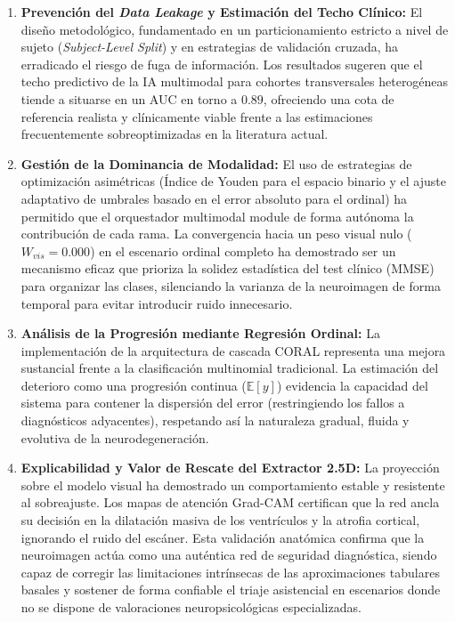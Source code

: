 \documentclass[12pt, oneside, english, spanish]{book}
\begin{document}
\begin{enumerate}
	\item \textbf{Prevención del \textit{Data Leakage} y Estimación del Techo Clínico:} El diseño metodológico, fundamentado en un particionamiento estricto a nivel de sujeto (\textit{Subject-Level Split}) y en estrategias de validación cruzada, ha erradicado el riesgo de fuga de información. Los resultados sugeren que el techo predictivo de la IA multimodal para cohortes transversales heterogéneas tiende a situarse en un AUC en torno a $0.89$, ofreciendo una cota de referencia realista y clínicamente viable frente a las estimaciones frecuentemente sobreoptimizadas en la literatura actual.
	
	\item \textbf{Gestión de la Dominancia de Modalidad:} El uso de estrategias de optimización asimétricas (Índice de Youden para el espacio binario y el ajuste adaptativo de umbrales basado en el error absoluto para el ordinal) ha permitido que el orquestador multimodal module de forma autónoma la contribución de cada rama. La convergencia hacia un peso visual nulo ($W_{vis} = 0.000$) en el escenario ordinal completo ha demostrado ser un mecanismo eficaz que prioriza la solidez estadística del test clínico (MMSE) para organizar las clases, silenciando la varianza de la neuroimagen de forma temporal para evitar introducir ruido innecesario.
	
	\item \textbf{Análisis de la Progresión mediante Regresión Ordinal:} La implementación de la arquitectura de cascada CORAL representa una mejora sustancial frente a la clasificación multinomial tradicional. La estimación del deterioro como una progresión continua ($\mathbb{E}[y]$) evidencia la capacidad del sistema para contener la dispersión del error (restringiendo los fallos a diagnósticos adyacentes), respetando así la naturaleza gradual, fluida y evolutiva de la neurodegeneración.
	
	\item \textbf{Explicabilidad y Valor de Rescate del Extractor 2.5D:} La proyección sobre el modelo visual ha demostrado un comportamiento estable y resistente al sobreajuste. Los mapas de atención Grad-CAM certifican que la red ancla su decisión en la dilatación masiva de los ventrículos y la atrofia cortical, ignorando el ruido del escáner. Esta validación anatómica confirma que la neuroimagen actúa como una auténtica red de seguridad diagnóstica, siendo capaz de corregir las limitaciones intrínsecas de las aproximaciones tabulares basales y sostener de forma confiable el triaje asistencial en escenarios donde no se dispone de valoraciones neuropsicológicas especializadas.
\end{enumerate}
\end{document}

